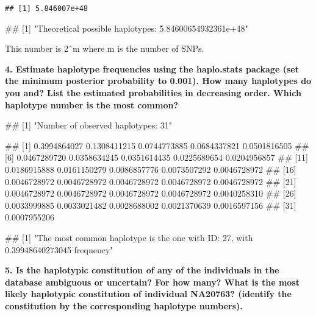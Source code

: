\documentclass[]{article}
\newenvironment{Shaded}{\begin{snugshade}}{\end{snugshade}}
\newcommand{\NormalTok}[1]{#1}
\begin{document}
\begin{verbatim}
## [1] 5.846007e+48
\end{verbatim}

\begin{Shaded}
\begin{Highlighting}[]
\NormalTok{## [1] "Theoretical possible haplotypes: 5.84600654932361e+48"}
\end{Highlighting}
\end{Shaded}

This number is 2ˆm where m is the number of SNPs.

\textbf{4. Estimate haplotype frequencies using the haplo.stats package
(set the minimum posterior probability to 0.001). How many haplotypes do
you and? List the estimated probabilities in decreasing order. Which
haplotype number is the most common?}

\begin{Shaded}
\begin{Highlighting}[]
\NormalTok{## [1] "Number of observed haplotypes: 31"}

\NormalTok{## [1] 0.3994864027 0.1308411215 0.0744773885 0.0684337821 0.0501816505}
\NormalTok{## [6] 0.0467289720 0.0358634245 0.0351614435 0.0225689654 0.0204956857}
\NormalTok{## [11] 0.0186915888 0.0161150279 0.0086857776 0.0073507292 0.0046728972}
\NormalTok{## [16] 0.0046728972 0.0046728972 0.0046728972 0.0046728972 0.0046728972}
\NormalTok{## [21] 0.0046728972 0.0046728972 0.0046728972 0.0046728972 0.0040258310}
\NormalTok{## [26] 0.0033999885 0.0033021482 0.0028688002 0.0021370639 0.0016597156}
\NormalTok{## [31] 0.0007955206}

\NormalTok{## [1] "The most common haplotype is the one with ID: 27, with 0.39948640273045 frequency"}
\end{Highlighting}
\end{Shaded}

\textbf{5. Is the haplotypic constitution of any of the individuals in
the database ambiguous or uncertain? For how many? What is the most
likely haplotypic constitution of individual NA20763? (identify the
constitution by the corresponding haplotype numbers).}
\end{document}
